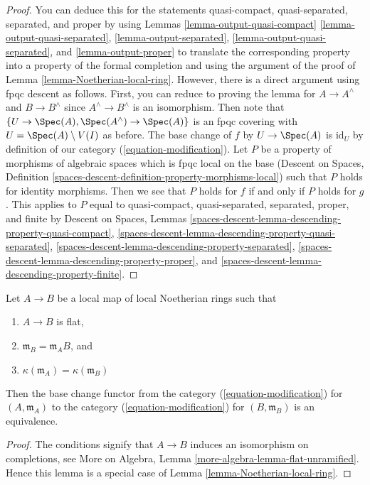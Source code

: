 \begin{proof}
You can deduce this for the statements
quasi-compact, quasi-separated, separated, and proper
by using Lemmas \ref{lemma-output-quasi-compact}
\ref{lemma-output-quasi-separated},
\ref{lemma-output-separated},
\ref{lemma-output-quasi-separated}, and
\ref{lemma-output-proper}
to translate the corresponding property into a property
of the formal completion and using the argument of the proof
of Lemma \ref{lemma-Noetherian-local-ring}.
However, there is a direct argument using fpqc descent as follows.
First, you can reduce to proving the lemma for $A \to A^\wedge$
and $B \to B^\wedge$ since $A^\wedge  \to B^\wedge$ is an isomorphism.
Then note that $\{U \to \Spec(A), \Spec(A^\wedge) \to \Spec(A)\}$ is an
fpqc covering with $U = \Spec(A) \setminus V(I)$ as before.
The base change of $f$ by $U \to \Spec(A)$ is $\text{id}_U$
by definition of our category (\ref{equation-modification}).
Let $P$ be a property of morphisms of algebraic spaces which
is fpqc local on the base (Descent on Spaces, Definition
\ref{spaces-descent-definition-property-morphisms-local})
such that $P$ holds for identity morphisms.
Then we see that $P$ holds for $f$ if and only if $P$ holds for $g$.
This applies to $P$ equal to
quasi-compact, quasi-separated, separated, proper, and finite
by
Descent on Spaces, Lemmas
\ref{spaces-descent-lemma-descending-property-quasi-compact},
\ref{spaces-descent-lemma-descending-property-quasi-separated},
\ref{spaces-descent-lemma-descending-property-separated},
\ref{spaces-descent-lemma-descending-property-proper}, and
\ref{spaces-descent-lemma-descending-property-finite}.
\end{proof}

\begin{lemma}
\label{lemma-equivalence-to-completion}
Let $A \to B$ be a local map of local Noetherian rings such that
\begin{enumerate}
\item $A \to B$ is flat,
\item $\mathfrak m_B = \mathfrak m_A B$, and
\item $\kappa(\mathfrak m_A) = \kappa(\mathfrak m_B)$
\end{enumerate}
Then the base change functor from the category
(\ref{equation-modification}) for $(A, \mathfrak m_A)$ to the category
(\ref{equation-modification}) for $(B, \mathfrak m_B)$
is an equivalence.
\end{lemma}

\begin{proof}
The conditions signify that $A \to B$ induces an isomorphism on
completions, see
More on Algebra, Lemma \ref{more-algebra-lemma-flat-unramified}.
Hence this lemma is a special case of
Lemma \ref{lemma-Noetherian-local-ring}.
\end{proof}

